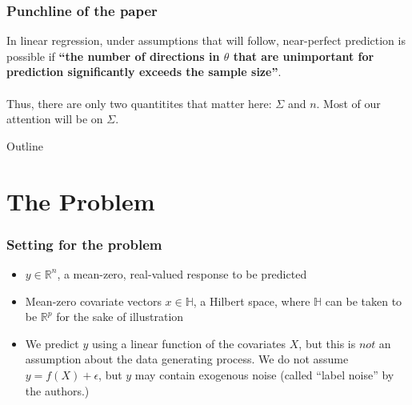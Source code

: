 \documentclass[pdf]{beamer}
\begin{document}
\begin{frame}

\frametitle{Punchline of the paper}

In linear regression, under assumptions that will follow, near-perfect prediction is possible if \textbf{``the number of directions in $\theta$ that are unimportant for prediction significantly exceeds the sample size''}.\\~\\

Thus, there are only two quantitites that matter here: $\Sigma$ and $n$.  Most of our attention will be on $\Sigma$.
\end{frame}

\begin{frame}{Outline}
    \tableofcontents
\end{frame}


\section{The Problem}

\begin{frame}
\frametitle{Setting for the problem}

\begin{itemize}
\item $y\in \mathbb{R}^{n}$, a mean-zero, real-valued response to be predicted 
\item Mean-zero covariate vectors $x \in \mathbb{H}$, a Hilbert space, where $\mathbb{H}$ can be taken to be $\mathbb{R}^{p}$ for the sake of illustration
\item We predict $y$ using a linear function of the covariates $X$, but this is $\textit{not}$ an assumption about the data generating process.  We do not assume  $y = f(X) + \epsilon$, but $y$ may contain exogenous noise (called ``label noise'' by the authors.)
\end{itemize}
\end{frame}
\end{document}

